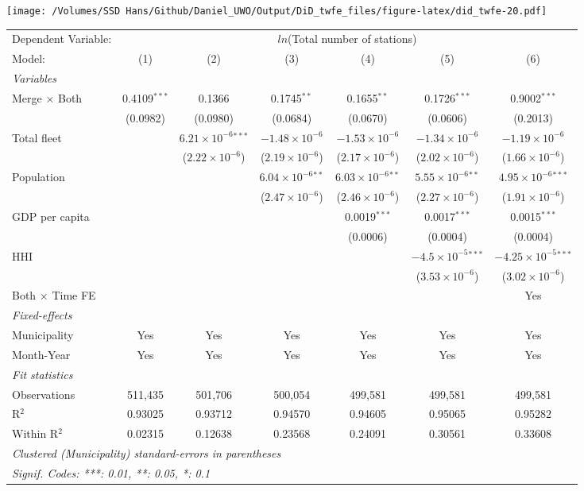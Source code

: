 \documentclass[
]{article}
\begin{document}
\texttt{[image: /Volumes/SSD Hans/Github/Daniel\_UWO/Output/DiD\_twfe\_files/figure-latex/did\_twfe-20.pdf]}

\begin{tabular}{lcccccc}
\tabularnewline\midrule\midrule
Dependent Variable:&\multicolumn{6}{c}{$ln$(Total number of stations)}\\
Model:&(1) & (2) & (3) & (4) & (5) & (6)\\
\midrule \emph{Variables}&   &   &   &   &   &  \\
Merge $\times $ Both & 0.4109$^{***}$ & 0.1366 & 0.1745$^{**}$ & 0.1655$^{**}$ & 0.1726$^{***}$ & 0.9002$^{***}$\\
  &(0.0982) & (0.0980) & (0.0684) & (0.0670) & (0.0606) & (0.2013)\\
Total fleet &    & $6.21\times 10^{-6}$$^{***}$ & $-1.48\times 10^{-6}$ & $-1.53\times 10^{-6}$ & $-1.34\times 10^{-6}$ & $-1.19\times 10^{-6}$\\
  &   & ($2.22\times 10^{-6}$) & ($2.19\times 10^{-6}$) & ($2.17\times 10^{-6}$) & ($2.02\times 10^{-6}$) & ($1.66\times 10^{-6}$)\\
Population &    &    & $6.04\times 10^{-6}$$^{**}$ & $6.03\times 10^{-6}$$^{**}$ & $5.55\times 10^{-6}$$^{**}$ & $4.95\times 10^{-6}$$^{***}$\\
  &   &    & ($2.47\times 10^{-6}$) & ($2.46\times 10^{-6}$) & ($2.27\times 10^{-6}$) & ($1.91\times 10^{-6}$)\\
GDP per capita &    &    &    & 0.0019$^{***}$ & 0.0017$^{***}$ & 0.0015$^{***}$\\
  &   &    &    & (0.0006) & (0.0004) & (0.0004)\\
HHI &    &    &    &    & $-4.5\times 10^{-5}$$^{***}$ & $-4.25\times 10^{-5}$$^{***}$\\
  &   &    &    &    & ($3.53\times 10^{-6}$) & ($3.02\times 10^{-6}$)\\
Both $\times$ Time FE &  &  &  &  &  & Yes\\
\midrule \emph{Fixed-effects}&   &   &   &   &   &  \\
Municipality & Yes & Yes & Yes & Yes & Yes & Yes\\
Month-Year & Yes & Yes & Yes & Yes & Yes & Yes\\
\midrule \emph{Fit statistics}&  & & & & & \\
Observations & 511,435&501,706&500,054&499,581&499,581&499,581\\
R$^2$ & 0.93025&0.93712&0.94570&0.94605&0.95065&0.95282\\
Within R$^2$ & 0.02315&0.12638&0.23568&0.24091&0.30561&0.33608\\
\midrule\midrule\multicolumn{7}{l}{\emph{Clustered (Municipality) standard-errors in parentheses}}\\
\multicolumn{7}{l}{\emph{Signif. Codes: ***: 0.01, **: 0.05, *: 0.1}}\\
\end{tabular}
\end{document}
